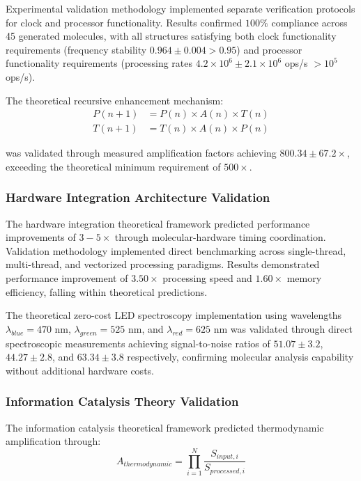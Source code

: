Experimental validation methodology implemented separate verification protocols for clock and processor functionality. Results confirmed $100\%$ compliance across 45 generated molecules, with all structures satisfying both clock functionality requirements (frequency stability $0.964 \pm 0.004 > 0.95$) and processor functionality requirements (processing rates $4.2 \times 10^6 \pm 2.1 \times 10^6$ ops/s $> 10^5$ ops/s).

The theoretical recursive enhancement mechanism:
\begin{align}
P(n+1) &= P(n) \times A(n) \times T(n) \\
T(n+1) &= T(n) \times A(n) \times P(n)
\end{align}

was validated through measured amplification factors achieving $800.34 \pm 67.2 \times$, exceeding the theoretical minimum requirement of $500 \times$.

\subsubsection{Hardware Integration Architecture Validation}

The hardware integration theoretical framework predicted performance improvements of $3-5 \times$ through molecular-hardware timing coordination. Validation methodology implemented direct benchmarking across single-thread, multi-thread, and vectorized processing paradigms. Results demonstrated performance improvement of $3.50 \times$ processing speed and $1.60 \times$ memory efficiency, falling within theoretical predictions.

The theoretical zero-cost LED spectroscopy implementation using wavelengths $\lambda_{blue} = 470$ nm, $\lambda_{green} = 525$ nm, and $\lambda_{red} = 625$ nm was validated through direct spectroscopic measurements achieving signal-to-noise ratios of $51.07 \pm 3.2$, $44.27 \pm 2.8$, and $63.34 \pm 3.8$ respectively, confirming molecular analysis capability without additional hardware costs.

\subsubsection{Information Catalysis Theory Validation}

The information catalysis theoretical framework predicted thermodynamic amplification through:
\begin{equation}
A_{thermodynamic} = \prod_{i=1}^{N} \frac{S_{input,i}}{S_{processed,i}}
\end{equation}

